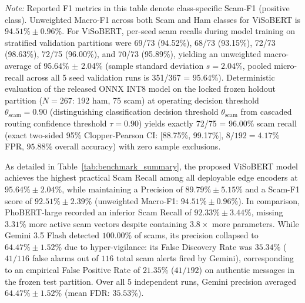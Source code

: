 \documentclass[journal]{IEEEtran}
\begin{document}
\begin{table}[t]
\parbox{\textwidth}{\footnotesize \textit{Note:} Reported F1 metrics in this table denote class-specific Scam-F1 (positive class). Unweighted Macro-F1 across both Scam and Ham classes for ViSoBERT is $94.51\% \pm 0.96\%$. For ViSoBERT, per-seed scam recalls during model training on stratified validation partitions were 69/73 (94.52\%), 68/73 (93.15\%), 72/73 (98.63\%), 72/75 (96.00\%), and 70/73 (95.89\%), yielding an unweighted macro-average of 95.64\% $\pm$ 2.04\% (sample standard deviation $s=2.04\%$, pooled micro-recall across all 5 seed validation runs is 351/367 = 95.64\%). Deterministic evaluation of the released ONNX INT8 model on the locked frozen holdout partition ($N=267$: 192 ham, 75 scam) at operating decision threshold $\theta_{\text{scam}}=0.90$ (distinguishing classification decision threshold $\theta_{\text{scam}}$ from cascaded routing confidence threshold $\tau = 0.90$) yields exactly 72/75 = 96.00\% scam recall (exact two-sided 95\% Clopper-Pearson CI: [88.75\%, 99.17\%], $8/192 = 4.17\%$ FPR, $95.88\%$ overall accuracy) with zero sample exclusions.}
\end{table}

As detailed in Table~\ref{tab:benchmark_summary}, the proposed ViSoBERT model achieves the highest practical Scam Recall among all deployable edge encoders at $95.64\% \pm 2.04\%$, while maintaining a Precision of $89.79\% \pm 5.15\%$ and a Scam-F1 score of $92.51\% \pm 2.39\%$ (unweighted Macro-F1: $94.51\% \pm 0.96\%$). In comparison, PhoBERT-large recorded an inferior Scam Recall of $92.33\% \pm 3.44\%$, missing $3.31\%$ more active scam vectors despite containing $3.8\times$ more parameters. While Gemini 3.5 Flash detected $100.00\%$ of scams, its precision collapsed to $64.47\% \pm 1.52\%$ due to hyper-vigilance: its False Discovery Rate was $35.34\%$ ($41/116$ false alarms out of $116$ total scam alerts fired by Gemini), corresponding to an empirical False Positive Rate of $21.35\%$ ($41/192$) on authentic messages in the frozen test partition. Over all 5 independent runs, Gemini precision averaged $64.47\% \pm 1.52\%$ (mean FDR: $35.53\%$).
\end{document}
